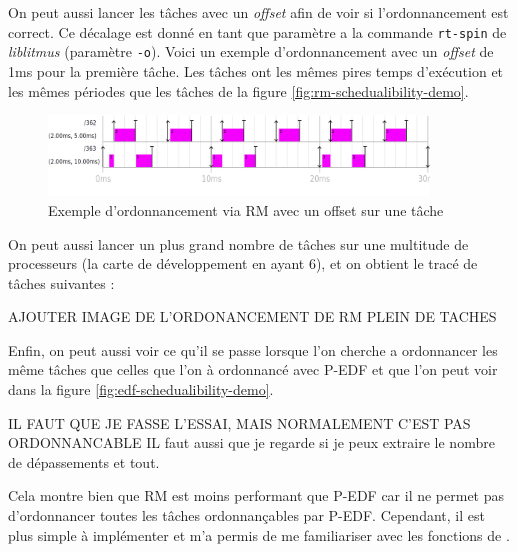 On peut aussi lancer les tâches avec un \textit{offset} afin de voir si l'ordonnancement est correct. Ce décalage est donné en tant que paramètre a la commande \texttt{rt-spin} de \textit{liblitmus} (paramètre \texttt{-o}). Voici un exemple d'ordonnancement avec un \textit{offset} de 1ms pour la première tâche. Les tâches ont les mêmes pires temps d'exécution et les mêmes périodes que les tâches de la figure \ref{fig:rm-schedualibility-demo}.
\begin{figure}[H]
    \centering
    \includegraphics[width=0.9\textwidth]{Images/RM_OFFSET_SCHED.png}
    \caption{Exemple d'ordonnancement via RM avec un offset sur une tâche}
\end{figure}

On peut aussi lancer un plus grand nombre de tâches sur une multitude de processeurs (la carte de développement en ayant 6), et on obtient le tracé de tâches suivantes : 
\begin{center}
    \color{red} AJOUTER IMAGE DE L'ORDONANCEMENT DE RM PLEIN DE TACHES
\end{center}


Enfin, on peut aussi voir ce qu'il se passe lorsque l'on cherche a ordonnancer les même tâches que celles que l'on à ordonnancé avec P-EDF et que l'on peut voir dans la figure \ref{fig:edf-schedualibility-demo}.

\begin{center}
    \color{red}IL FAUT QUE JE FASSE L'ESSAI, MAIS NORMALEMENT C'EST PAS ORDONNANCABLE
    IL faut aussi que je regarde si je peux extraire le nombre de dépassements et tout.
\end{center}

Cela montre bien que RM est moins performant que P-EDF car il ne permet pas d'ordonnancer toutes les tâches ordonnançables par P-EDF. Cependant, il est plus simple à implémenter et m'a permis de me familiariser avec les fonctions de \litmus.


